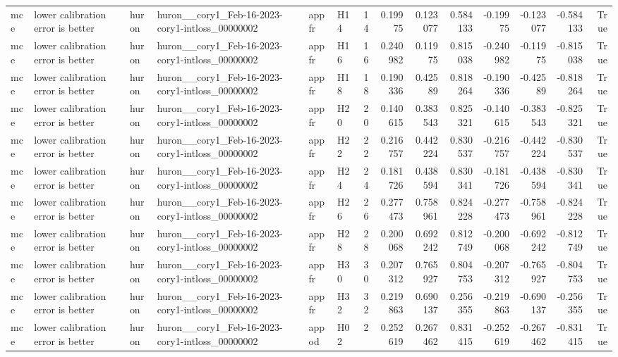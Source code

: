 \begin{longtable}{llllllrrrrrrrr}
mce & lower calibration error is better & huron & huron\_\_cory1\_Feb-16-2023-cory1-intloss\_00000002 & appfr & H14 & 14 & 0.19975 & 0.123077 & 0.584133 & -0.19975 & -0.123077 & -0.584133 & True \\
mce & lower calibration error is better & huron & huron\_\_cory1\_Feb-16-2023-cory1-intloss\_00000002 & appfr & H16 & 16 & 0.240982 & 0.11975 & 0.815038 & -0.240982 & -0.11975 & -0.815038 & True \\
mce & lower calibration error is better & huron & huron\_\_cory1\_Feb-16-2023-cory1-intloss\_00000002 & appfr & H18 & 18 & 0.190336 & 0.42589 & 0.818264 & -0.190336 & -0.42589 & -0.818264 & True \\
mce & lower calibration error is better & huron & huron\_\_cory1\_Feb-16-2023-cory1-intloss\_00000002 & appfr & H20 & 20 & 0.140615 & 0.383543 & 0.825321 & -0.140615 & -0.383543 & -0.825321 & True \\
mce & lower calibration error is better & huron & huron\_\_cory1\_Feb-16-2023-cory1-intloss\_00000002 & appfr & H22 & 22 & 0.216757 & 0.442224 & 0.830537 & -0.216757 & -0.442224 & -0.830537 & True \\
mce & lower calibration error is better & huron & huron\_\_cory1\_Feb-16-2023-cory1-intloss\_00000002 & appfr & H24 & 24 & 0.181726 & 0.438594 & 0.830341 & -0.181726 & -0.438594 & -0.830341 & True \\
mce & lower calibration error is better & huron & huron\_\_cory1\_Feb-16-2023-cory1-intloss\_00000002 & appfr & H26 & 26 & 0.277473 & 0.758961 & 0.824228 & -0.277473 & -0.758961 & -0.824228 & True \\
mce & lower calibration error is better & huron & huron\_\_cory1\_Feb-16-2023-cory1-intloss\_00000002 & appfr & H28 & 28 & 0.200068 & 0.692242 & 0.812749 & -0.200068 & -0.692242 & -0.812749 & True \\
mce & lower calibration error is better & huron & huron\_\_cory1\_Feb-16-2023-cory1-intloss\_00000002 & appfr & H30 & 30 & 0.207312 & 0.765927 & 0.804753 & -0.207312 & -0.765927 & -0.804753 & True \\
mce & lower calibration error is better & huron & huron\_\_cory1\_Feb-16-2023-cory1-intloss\_00000002 & appfr & H32 & 32 & 0.219863 & 0.690137 & 0.256355 & -0.219863 & -0.690137 & -0.256355 & True \\
mce & lower calibration error is better & huron & huron\_\_cory1\_Feb-16-2023-cory1-intloss\_00000002 & appod & H02 & 2 & 0.252619 & 0.267462 & 0.831415 & -0.252619 & -0.267462 & -0.831415 & True \\

\end{longtable}
